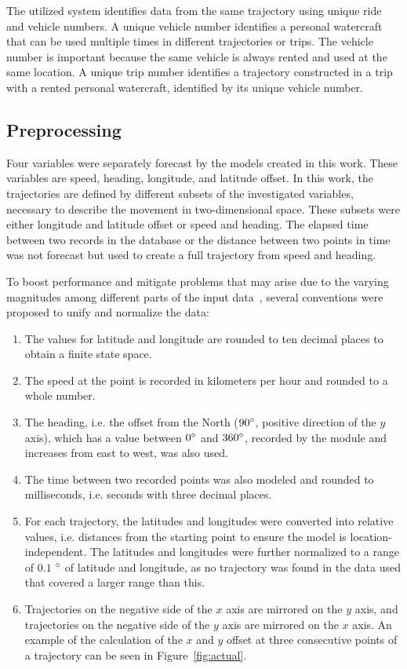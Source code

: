 \documentclass[preprint,12pt]{elsarticle}
\begin{document}
The utilized system identifies data from the same trajectory using unique ride and vehicle numbers. A unique vehicle number identifies a personal watercraft that can be used multiple times in different trajectories or trips. The vehicle number is important because the same vehicle is always rented and used at the same location. A unique trip number identifies a trajectory constructed in a trip with a rented personal watercraft, identified by its unique vehicle number.

\subsection{Preprocessing}

Four variables were separately forecast by the models created in this work. These variables are speed, heading, longitude, and latitude offset. In this work, the trajectories are defined by different subsets of the investigated variables, necessary to describe the movement in two-dimensional space. These subsets were either longitude and latitude offset or speed and heading. The elapsed time between two records in the database or the distance between two points in time was not forecast but used to create a full trajectory from speed and heading.

To boost performance and mitigate problems that may arise due to the varying magnitudes among different parts of the input data~\cite{singh2020investigating, nawi2013effect}, several conventions were proposed to unify and normalize the data:

\begin{enumerate}[i]
  \item The values for latitude and longitude are rounded to ten decimal places to obtain a finite state space.
  \item The speed at the point is recorded in kilometers per hour and rounded to a whole number.
  \item The heading, i.e. the offset from the North ($90\degree$, positive direction of the $y$ axis), which has a value between $0\degree$ and $360\degree$, recorded by the module and increases from east to west, was also used.
  \item The time between two recorded points was also modeled and rounded to milliseconds, i.e. seconds with three decimal places.
  \item For each trajectory, the latitudes and longitudes were converted into relative values, i.e. distances from the starting point to ensure the model is location-independent. The latitudes and longitudes were further normalized to a range of $0.1$ $\degree$ of latitude and longitude, as no trajectory was found in the data used that covered a larger range than this.
  \item Trajectories on the negative side of the $x$ axis are mirrored on the $y$ axis, and trajectories on the negative side of the $y$ axis are mirrored on the $x$ axis. An example of the calculation of the $x$ and $y$ offset at three consecutive points of a trajectory can be seen in Figure~\ref{fig:actual}.
\end{enumerate}
\end{document}
